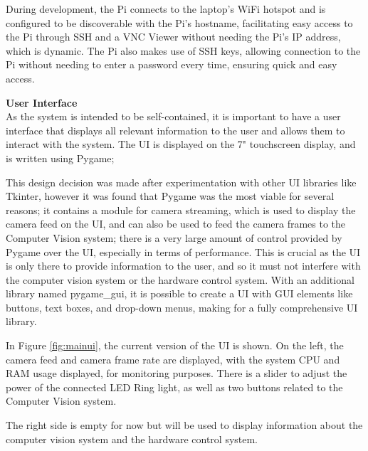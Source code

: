 During development, the Pi connects to the laptop's WiFi hotspot and is configured to be discoverable with the Pi's hostname, facilitating easy access to the Pi through
SSH and a VNC Viewer without needing the Pi's IP address, which is dynamic. The Pi also makes use of SSH keys, allowing connection 
to the Pi without needing to enter a password every time, ensuring quick and easy access.



\noindent
\textbf{User Interface} \\
As the system is intended to be self-contained, it is important to have a user interface that displays all relevant information to the user
and allows them to interact with the system. The UI is displayed on the 7" touchscreen display, and is written using Pygame\cite{pygamedoc};

This design decision was made after experimentation with other UI libraries like Tkinter\cite{tkinterdoc}, however it was found that Pygame was the most
viable for several reasons; it contains a module for camera streaming, which is used to display the camera feed on the UI, and can also be used to
feed the camera frames to the Computer Vision system; there is a very large amount of control provided by Pygame over the UI, especially in terms of 
performance. This is crucial as the UI is only there to provide information to the user, and so it must not interfere with the
computer vision system or the hardware control system. With an additional library named pygame\_gui\cite{pygamegui}, it is possible to create a UI with 
GUI elements like buttons, text boxes, and drop-down menus, making for a fully comprehensive UI library.

In Figure \ref{fig:mainui}, the current version of the UI is shown. On the left, the camera feed and camera frame rate are displayed, with the system
CPU and RAM usage displayed, for monitoring purposes. There is a slider to adjust the power of the connected LED Ring light, as well as two buttons
related to the Computer Vision system.

The right side is empty for now but will be used to display information about the computer vision system and the hardware control system.

